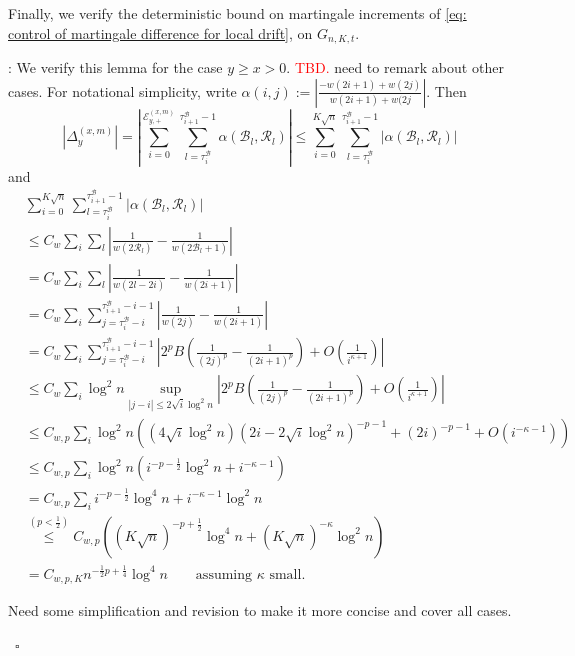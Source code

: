 \documentclass[twoside,12pt,a4paper]{article}
\numberwithin{equation}{section}
\newenvironment{proof}[1][Proof]{{\sc #1}:}{~\hfill $\square$}
\newcommand\TBD{\textcolor{red}{TBD.}}
\begin{document}
\vspace{2em}

Finally, we verify the deterministic bound on martingale increments of \eqref{eq: control of martingale difference for local drift}, on $G_{n, K, t}$.

\begin{proof}[Proof of Lemma~\ref{lm:lipchitz-bound-on-good-event}]
	We verify this lemma for the case $y \ge  x > 0$. \TBD {\color{red} need to remark about other cases}.
	For notational simplicity, write $\alpha(i,j) := \left|\frac{-w(2 i + 1) + w(2 j)}{w(2i + 1) + w(2 j}\right|$. Then
\begin{equation*}
	\left| \Delta_y^{(x,m)} \right| 
	= 
	\left| 	\sum_{i = 0}^{\mathcal{E}_{y,+}^{(x,m)}} 
	\sum_{l = \tau_i^{\mathcal{B}}} ^{\tau_{i+1}^{\mathcal{B}}  -1}
	\alpha(\mathcal{B}_l, \mathcal{R}_l)
	\right| 
	\le 
	\sum_{i = 0}^{K \sqrt{n} } 
	\sum_{l = \tau_i^{\mathcal{B}}} ^{\tau_{i+1}^{\mathcal{B}}  -1}
	\left|
	\alpha(\mathcal{B}_l, \mathcal{R}_l)
	\right| 
\end{equation*}
and
\begin{align*}
	&\sum_{i = 0}^{K \sqrt{n} } 
	\sum_{l = \tau_i^{\mathcal{B}}} ^{\tau_{i+1}^{\mathcal{B}}  -1}
	|\alpha(\mathcal{B}_l, \mathcal{R}_l)|\\
	&\le C_w \sum_i \sum_l \left| \frac{1}{w(2 \mathcal{R}_l)} - \frac{1}{w(2 \mathcal{B}_l + 1)} \right|  \\
	&= C_w \sum_i \sum_l \left| \frac{1}{w(2 l - 2 i)} - \frac{1}{w(2i + 1)} \right|  \\
	&= C_w \sum_i \sum_{j = \tau_i^{\mathcal{B}} - i}^{\tau_{i+1}^{\mathcal{B}} - i - 1} \left| \frac{1}{w(2j)} - \frac{1}{w(2i + 1)} \right|  \\
	&= C_w \sum_i \sum_{j = \tau_i^{\mathcal{B}} - i}^{\tau_{i+1}^{\mathcal{B}} - i - 1} \left|  2^p B\left( \frac{1}{(2j)^p} - \frac{1}{(2i + 1)^p} \right)  + O\left( \frac{1}{i^{\kappa + 1}} \right) \right|  \\
	&\le C_w \sum_i \log^2 n \sup_{|j - i| \le 2 \sqrt{i}  \log^2 n} \left|  2^p B\left( \frac{1}{(2j)^p} - \frac{1}{(2i + 1)^p} \right)  + O\left( \frac{1}{i^{\kappa + 1}} \right) \right| \\
	&\le C_{w, p} \sum_i \log^2 n \left( 
		(4 \sqrt{ i } \log^2 n) (2 i - 2 \sqrt{ i } \log^2 n)^{- p - 1} + (2 i)^{- p - 1} + O(i^{- \kappa - 1})
	\right)  \\
	&\le C_{w, p} \sum_i \log^2 n \left( i ^{-p - \frac{1}{2}} \log^2 n +  i^{- \kappa - 1} \right)  \\
	&= C_{w, p} \sum_i i^{- p - \frac{1}{2}} \log^4 n + i^{- \kappa - 1 } \log^2 n \\
	&\stackrel{(p<\frac{1}{2})}{\le } C_{w, p} \left( (K \sqrt{ n} )^{-p+ \frac{1}{2}} \log^4 n + (K \sqrt{ n} )^{- \kappa } \log^2 n \right)  \\
	&= C_{w, p, K} n^{-\frac{1}{2}p + \frac{1}{4}  }  \log^4 n \qquad \text{assuming $\kappa$ small}
.\end{align*} 

{\color{red} Need some simplification and revision to make it more concise and cover all cases.}

\end{proof}
\end{document}
